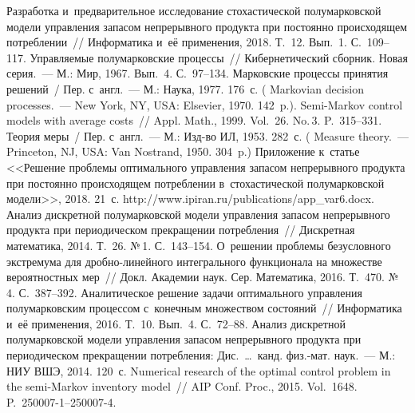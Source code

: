 \begin{multicols}{2}
{\small\frenchspacing
 {%
 \begin{thebibliography}{99}
   Разработка и~предварительное 
исследование стохастической полумарковской модели управ\-ле\-ния запасом 
непрерывного продукта при по\-сто\-ян\-но происходящем по\-треб\-ле\-нии~// 
Информатика и~её применения, 2018. Т.~12. Вып.~1. С.~109--117.
   Управ\-ля\-емые полумарковские процессы~// 
Кибернетический сбор\-ник. Новая серия.~--- М.: Мир, 1967. Вып.~4. С.~97--134.
   Марковские процессы принятия решений~/ Пер. 
с~англ.~--- М.: Наука, 1977. 176~с. ( Markovian decision 
processes.~--- New York, NY, USA: Elsevier, 1970. 142~p.).
   Semi-Markov control models with 
average costs~// Appl. Math., 1999. Vol.~26. No.\,3. P.~315--331.
   Теория меры~/ Пер. с~англ.~--- М.: Изд-во ИЛ, 
  1953. 282~с. ( Measure theory.~--- Princeton, NJ, 
USA: Van Nostrand, 1950. 304~p.)
   Приложение к~\mbox{статье} <<Решение 
проб\-ле\-мы оптимального управ\-ле\-ния запасом непрерывного продукта при 
по\-сто\-ян\-но происходящем по\-треб\-ле\-нии в~стохастической полумарковской 
модели>>, 2018. 21~с. {\sf http://www.ipiran.ru/publications/app\_var6.docx}.
   Анализ дискретной полумарковской 
модели управ\-ле\-ния запасом непрерывного продукта при периодическом 
прекращении по\-треб\-ле\-ния~// Дискретная математика, 2014. Т.~26. №\,1. 
С.~143--154. 
   О~решении проб\-ле\-мы без\-услов\-но\-го экстремума для  
дроб\-но-ли\-ней\-но\-го интегрального функционала на множестве 
вероятностных мер~// Докл. Академии наук. Сер. Математика, 2016. Т.~470. 
№\,4. С.~387--392.
   Аналитическое 
решение задачи оптимального управ\-ле\-ния полумарковским процессом 
с~конечным множеством со\-сто\-яний~// Информатика и~её применения, 2016. 
Т.~10. Вып.~4. С.~72--88.
   Анализ дискретной полумарковской модели управ\-ле\-ния 
запасом непрерывного продукта при периодическом прекращении по\-треб\-ле\-ния:\linebreak 
Дис.\ \ldots\ канд. физ.-мат. наук.~--- М.: НИУ ВШЭ, 2014. 120~с.
Numerical research of the optimal control problem in the semi-Markov inventory 
model~// AIP Conf. Proc., 2015. Vol.~1648. P.~250007-1--250007-4.
   \end{thebibliography}

 }
 }

\end{multicols}

